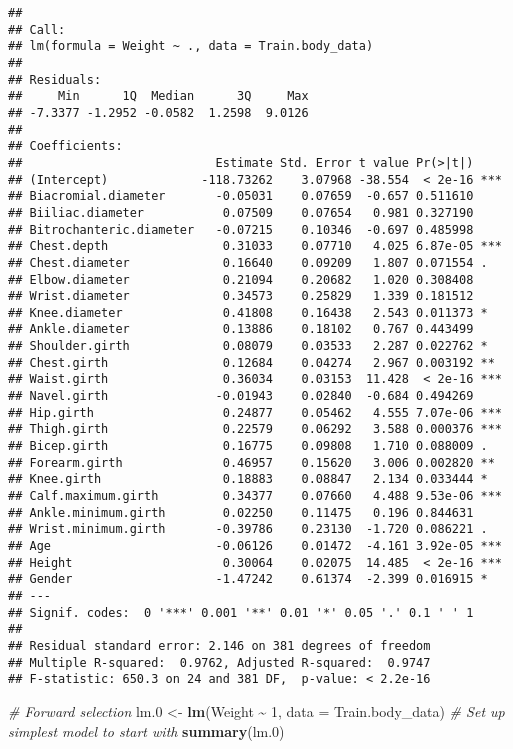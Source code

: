 \documentclass[
]{article}
\newenvironment{Shaded}{\begin{snugshade}}{\end{snugshade}}
\newcommand{\AttributeTok}[1]{\textcolor[rgb]{0.13,0.29,0.53}{#1}}
\newcommand{\CommentTok}[1]{\textcolor[rgb]{0.56,0.35,0.01}{\textit{#1}}}
\newcommand{\DecValTok}[1]{\textcolor[rgb]{0.00,0.00,0.81}{#1}}
\newcommand{\FloatTok}[1]{\textcolor[rgb]{0.00,0.00,0.81}{#1}}
\newcommand{\FunctionTok}[1]{\textcolor[rgb]{0.13,0.29,0.53}{\textbf{#1}}}
\newcommand{\NormalTok}[1]{#1}
\newcommand{\OtherTok}[1]{\textcolor[rgb]{0.56,0.35,0.01}{#1}}
\newcommand{\SpecialCharTok}[1]{\textcolor[rgb]{0.81,0.36,0.00}{\textbf{#1}}}
\begin{document}
\begin{verbatim}
## 
## Call:
## lm(formula = Weight ~ ., data = Train.body_data)
## 
## Residuals:
##     Min      1Q  Median      3Q     Max 
## -7.3377 -1.2952 -0.0582  1.2598  9.0126 
## 
## Coefficients:
##                           Estimate Std. Error t value Pr(>|t|)    
## (Intercept)             -118.73262    3.07968 -38.554  < 2e-16 ***
## Biacromial.diameter       -0.05031    0.07659  -0.657 0.511610    
## Biiliac.diameter           0.07509    0.07654   0.981 0.327190    
## Bitrochanteric.diameter   -0.07215    0.10346  -0.697 0.485998    
## Chest.depth                0.31033    0.07710   4.025 6.87e-05 ***
## Chest.diameter             0.16640    0.09209   1.807 0.071554 .  
## Elbow.diameter             0.21094    0.20682   1.020 0.308408    
## Wrist.diameter             0.34573    0.25829   1.339 0.181512    
## Knee.diameter              0.41808    0.16438   2.543 0.011373 *  
## Ankle.diameter             0.13886    0.18102   0.767 0.443499    
## Shoulder.girth             0.08079    0.03533   2.287 0.022762 *  
## Chest.girth                0.12684    0.04274   2.967 0.003192 ** 
## Waist.girth                0.36034    0.03153  11.428  < 2e-16 ***
## Navel.girth               -0.01943    0.02840  -0.684 0.494269    
## Hip.girth                  0.24877    0.05462   4.555 7.07e-06 ***
## Thigh.girth                0.22579    0.06292   3.588 0.000376 ***
## Bicep.girth                0.16775    0.09808   1.710 0.088009 .  
## Forearm.girth              0.46957    0.15620   3.006 0.002820 ** 
## Knee.girth                 0.18883    0.08847   2.134 0.033444 *  
## Calf.maximum.girth         0.34377    0.07660   4.488 9.53e-06 ***
## Ankle.minimum.girth        0.02250    0.11475   0.196 0.844631    
## Wrist.minimum.girth       -0.39786    0.23130  -1.720 0.086221 .  
## Age                       -0.06126    0.01472  -4.161 3.92e-05 ***
## Height                     0.30064    0.02075  14.485  < 2e-16 ***
## Gender                    -1.47242    0.61374  -2.399 0.016915 *  
## ---
## Signif. codes:  0 '***' 0.001 '**' 0.01 '*' 0.05 '.' 0.1 ' ' 1
## 
## Residual standard error: 2.146 on 381 degrees of freedom
## Multiple R-squared:  0.9762, Adjusted R-squared:  0.9747 
## F-statistic: 650.3 on 24 and 381 DF,  p-value: < 2.2e-16
\end{verbatim}

\begin{Shaded}
\begin{Highlighting}[]
\CommentTok{\# Forward selection}
\NormalTok{lm}\FloatTok{.0} \OtherTok{\textless{}{-}} \FunctionTok{lm}\NormalTok{(Weight }\SpecialCharTok{\textasciitilde{}} \DecValTok{1}\NormalTok{, }\AttributeTok{data =}\NormalTok{ Train.body\_data) }\CommentTok{\# Set up simplest model to start with}
\FunctionTok{summary}\NormalTok{(lm}\FloatTok{.0}\NormalTok{)}
\end{Highlighting}
\end{Shaded}
\end{document}
